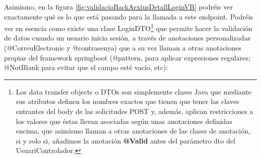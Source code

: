 \documentclass[a4paper,12pt]{report}
\begin{document}
			
			 Asimismo, en la figura  \ref{fig:validacioBackArxiusDetallLoginVB} podréis ver exactamente qué es lo que está pasando para la llamada a este endpoint. Podréis ver en esencia como existe una clase LoginDTO\footnote{Los data transfer objects o DTOs son simplemente clases Java que mediante sus atributos definen los nombres exactos que tienen que tener las claves entrantes del body de las solicitudes POST y, además, aplican restricciones a los valores que éstas llevan asociadas según unas anotaciones definidas encima, que asimismo llaman a otras anotaciones de las clases de anotación, si y solo si, añadimos la anotación \textbf{@Valid} antes del parámetro dto del UsuariControlador.} que permite hacer la validación de datos cuando un usuario inicia sesión, a través de anotaciones personalizadas (@CorreuElectronic y @contrasenya) que a su vez llaman a otras anotaciones propias del framework springboot (@pattern, para aplicar expresiones regulares; @NotBlank para evitar que el campo esté vacío, etc):
			
			
			

			
			
\end{document}
